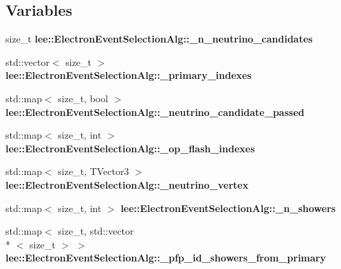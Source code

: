 \subsection*{Variables}
\begin{DoxyCompactItemize}
\item 
\hypertarget{group__lee_gab595a7373a091aab62b8f199248f320d}{size\-\_\-t {\bfseries lee\-::\-Electron\-Event\-Selection\-Alg\-::\-\_\-n\-\_\-neutrino\-\_\-candidates}}\label{group__lee_gab595a7373a091aab62b8f199248f320d}

\item 
\hypertarget{group__lee_ga90143a319f9dd71c5ba32b658f30ceb7}{std\-::vector$<$ size\-\_\-t $>$ {\bfseries lee\-::\-Electron\-Event\-Selection\-Alg\-::\-\_\-primary\-\_\-indexes}}\label{group__lee_ga90143a319f9dd71c5ba32b658f30ceb7}

\item 
\hypertarget{group__lee_gad074e6a2ccd754a2c15efa834932ffb9}{std\-::map$<$ size\-\_\-t, bool $>$ {\bfseries lee\-::\-Electron\-Event\-Selection\-Alg\-::\-\_\-neutrino\-\_\-candidate\-\_\-passed}}\label{group__lee_gad074e6a2ccd754a2c15efa834932ffb9}

\item 
\hypertarget{group__lee_ga2eb55a71628710eb97f89b2e6d78d236}{std\-::map$<$ size\-\_\-t, int $>$ {\bfseries lee\-::\-Electron\-Event\-Selection\-Alg\-::\-\_\-op\-\_\-flash\-\_\-indexes}}\label{group__lee_ga2eb55a71628710eb97f89b2e6d78d236}

\item 
\hypertarget{group__lee_ga25adf65208b5fcbb82b5f2bf69bc132c}{std\-::map$<$ size\-\_\-t, T\-Vector3 $>$ {\bfseries lee\-::\-Electron\-Event\-Selection\-Alg\-::\-\_\-neutrino\-\_\-vertex}}\label{group__lee_ga25adf65208b5fcbb82b5f2bf69bc132c}

\item 
\hypertarget{group__lee_ga76fb1477a75421ece942e311f9cac1d7}{std\-::map$<$ size\-\_\-t, int $>$ {\bfseries lee\-::\-Electron\-Event\-Selection\-Alg\-::\-\_\-n\-\_\-showers}}\label{group__lee_ga76fb1477a75421ece942e311f9cac1d7}

\item 
\hypertarget{group__lee_ga6d6863ea6968da00aedb35cdcc11e857}{std\-::map$<$ size\-\_\-t, std\-::vector\\*
$<$ size\-\_\-t $>$ $>$ {\bfseries lee\-::\-Electron\-Event\-Selection\-Alg\-::\-\_\-pfp\-\_\-id\-\_\-showers\-\_\-from\-\_\-primary}}\label{group__lee_ga6d6863ea6968da00aedb35cdcc11e857}


\end{DoxyCompactItemize}
